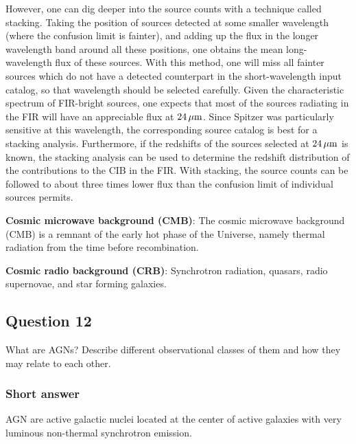 \documentclass[a4paper,10pt]{article}
\begin{document}
{\noindent}However, one can dig deeper into the source counts with a technique called stacking. Taking the position of sources detected at some smaller wavelength (where the confusion limit is fainter), and adding up the flux in the longer wavelength band around all these positions, one obtains the mean long-wavelength flux of these sources. With this method, one will miss all fainter sources which do not have a detected counterpart in the short-wavelength input catalog, so that wavelength should be selected carefully. Given the characteristic spectrum of FIR-bright sources, one expects that most of the sources radiating in the FIR will have an appreciable flux at $24\,\mu{\rm m}$. Since Spitzer was particularly sensitive at this wavelength, the corresponding source catalog is best for a stacking analysis. Furthermore, if the redshifts of the sources selected at $24\,\mu{\rm m}$ is known, the stacking analysis can be used to determine the redshift distribution of the contributions to the CIB in the FIR. With stacking, the source counts can be followed to about three times lower flux than the confusion limit of individual sources permits.

{\noindent}\textbf{Cosmic microwave background (CMB)}: The cosmic microwave background (CMB) is a remnant of the early hot phase of the Universe, namely thermal radiation from the time before recombination. 

{\noindent}\textbf{Cosmic radio background (CRB)}: Synchrotron radiation, quasars, radio supernovae, and star forming galaxies.


\newpage
\subsection{Question 12}

What are AGNs? Describe different observational classes of them and how they may relate to each other.

\subsubsection{Short answer}

AGN are active galactic nuclei located at the center of active galaxies with very luminous non-thermal synchrotron emission. 
\end{document}
